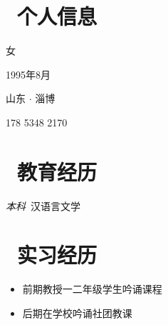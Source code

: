 \documentclass{resume}
\begin{document}



\vspace{1em}

\section{\faInfo\ 个人信息}
\vspace{0.5em}
\begin{description}[parsep=0.5ex]
  \item[性\hspace{4ex}别] \hspace{4ex}女
  \item[出生年月]         \hspace{4ex}1995年8月
  \item[籍\hspace{4ex}贯] \hspace{4ex}山东 $\cdot$ 淄博
  \item[联系电话]         \hspace{4ex}178 5348 2170
\end{description}

\vspace{1em}
 
\section{\faGraduationCap\  教育经历}
\vspace{0.5em}
\textit{本科}\ 汉语言文学

\vspace{1em}

\section{\faUsers\ 实习经历}
\vspace{0.5em}
\begin{onehalfspacing}
\begin{itemize}
  \item 前期教授一二年级学生吟诵课程
  \item 后期在学校吟诵社团教课
\end{itemize}
\end{onehalfspacing}
\end{document}
